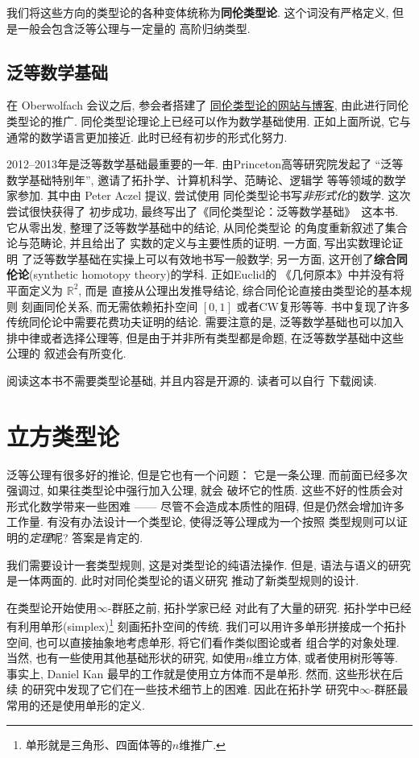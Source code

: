 我们将这些方向的类型论的各种变体统称为\textbf{同伦类型论}.
这个词没有严格定义, 但是一般会包含泛等公理与一定量的
高阶归纳类型.

\subsection{泛等数学基础}
在 Oberwolfach 会议之后, 参会者搭建了%
\href{http://homotopytypetheory.org/}{同伦类型论的网站与博客},
由此进行同伦类型论的推广.
同伦类型论理论上已经可以作为数学基础使用. 正如上面所说, 它与
通常的数学语言更加接近. 此时已经有初步的形式化努力.

2012--2013年是泛等数学基础最重要的一年. 由Princeton高等研究院发起了
“泛等数学基础特别年”, 邀请了拓扑学、计算机科学、范畴论、逻辑学
等等领域的数学家参加. 其中由 Peter Aczel 提议, 尝试使用
同伦类型论书写\emph{非形式化}的数学. 这次尝试很快获得了
初步成功, 最终写出了《同伦类型论：泛等数学基础》~\cite{ufp:2013:hottbook}这本书.
它从零出发, 整理了泛等数学基础中的结论, 从同伦类型论
的角度重新叙述了集合论与范畴论, 并且给出了
实数的定义与主要性质的证明. 一方面, 写出实数理论证明
了泛等数学基础在实操上可以有效地书写一般数学; 另一方面,
这开创了\textbf{综合同伦论}(synthetic homotopy theory)的学科. 正如Euclid的
《几何原本》中并没有将平面定义为 \(\mathbb R^2\), 而是
直接从公理出发推导结论, 综合同伦论直接由类型论的基本规则
刻画同伦关系, 而无需依赖拓扑空间 \([0,1]\) 或者CW复形等等.
书中复现了许多传统同伦论中需要花费功夫证明的结论.
需要注意的是, 泛等数学基础也可以加入排中律或者选择公理等,
但是由于并非所有类型都是命题, 在泛等数学基础中这些公理的
叙述会有所变化.

阅读这本书不需要类型论基础, 并且内容是开源的. 读者可以自行
下载阅读.

\section{立方类型论}

泛等公理有很多好的推论, 但是它也有一个问题： 它是一条公理.
而前面已经多次强调过, 如果往类型论中强行加入公理, 就会
破坏它的性质. 这些不好的性质会对形式化数学带来一些困难
------ 尽管不会造成本质性的阻碍, 但是仍然会增加许多工作量.
有没有办法设计一个类型论, 使得泛等公理成为一个按照
类型规则可以证明的\emph{定理}呢? 答案是肯定的.

我们需要设计一套类型规则, 这是对类型论的纯语法操作. 但是,
语法与语义的研究是一体两面的. 此时对同伦类型论的语义研究
推动了新类型规则的设计.

在类型论开始使用\(\infty\)-群胚之前, 拓扑学家已经
对此有了大量的研究. 拓扑学中已经有利用单形(simplex)\footnote{单形就是三角形、四面体等的\(n\)维推广.}
刻画拓扑空间的传统. 我们可以用许多单形拼接成一个拓扑空间,
也可以直接抽象地考虑单形, 将它们看作类似图论或者
组合学的对象处理. 当然, 也有一些使用其他基础形状的研究,
如使用\(n\)维立方体, 或者使用树形等等. 事实上, Daniel Kan
最早的工作就是使用立方体而不是单形. 然而, 这些形状在后续
的研究中发现了它们在一些技术细节上的困难. 因此在拓扑学
研究中\(\infty\)-群胚最常用的还是使用单形的定义.

